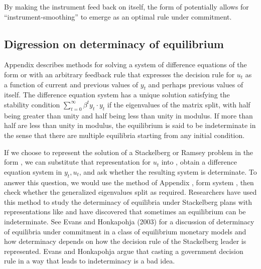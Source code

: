   By making the instrument feed back on itself,
the form of  potentially allows for
``instrument-smoothing'' to emerge as an optimal rule under
commitment.


\subsection{Digression on determinacy of equilibrium}
Appendix \the\chapternum{} describes methods for  solving a system of difference
equations of the form  or  with an arbitrary feedback rule that
expresses the decision rule for
$u_t$ as a function of current and  previous values of $y_t$ and perhaps previous values
of itself.  The difference equation system has  a unique solution
satisfying the stability condition $\sum_{t=0}^\infty \beta^t y_t \cdot  y_t$
if the eigenvalues of the matrix  split, with half being greater than
unity and half being less than unity in modulus.  If more than half are less than
unity in modulus, the equilibrium is said to be indeterminate %
 in the sense that there are multiple equilibria starting from any initial condition.

If we choose to represent the solution of a Stackelberg or Ramsey problem in the form
, we can substitute that representation for $u_t$ into
, obtain a difference equation system in $y_t, u_t$, and ask whether
the resulting system is determinate. To answer this question, we would use the method
of Appendix \the\chapternum{}, form system , then check whether the generalized
eigenvalues split as required.   Researchers have used this method to study the determinacy
of equilibria under Stackelberg plans with representations like  and have discovered
that sometimes an equilibrium can be indeterminate.  See Evans
and Honkapohja (2003) for a discussion of determinacy of equilibria under commitment
in a class of equilibrium monetary models and
how determinacy depends on how the decision rule of the Stackelberg leader is represented.  Evans and
Honkapohja argue that casting a government decision rule in a way that leads to indeterminacy is a bad idea.
